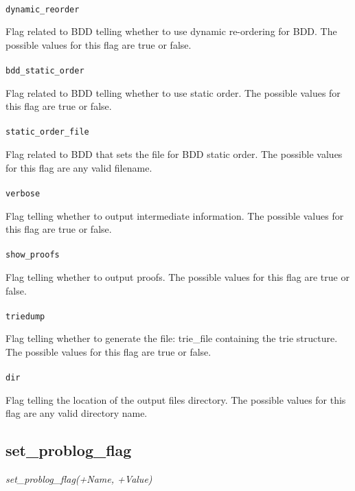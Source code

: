 \documentclass[a4paper,12pt]{article}
\begin{document}
\paragraph{}
\texttt{dynamic\_reorder}

Flag related to BDD telling whether to use dynamic re-ordering for BDD.
The possible values for this flag are true or false.
\paragraph{}
\texttt{bdd\_static\_order}

Flag related to BDD telling whether to use static order.
The possible values for this flag are true or false.
\paragraph{}
\texttt{static\_order\_file}

Flag related to BDD that sets the file for BDD static order.
The possible values for this flag are any valid filename.
\paragraph{}
\texttt{verbose}

Flag telling whether to output intermediate information.
The possible values for this flag are true or false.
\paragraph{}
\texttt{show\_proofs}

Flag telling whether to output proofs.
The possible values for this flag are true or false.
\paragraph{}
\texttt{triedump}

Flag telling whether to generate the file: trie\_file containing the trie structure.
The possible values for this flag are true or false.
\paragraph{}
\texttt{dir}

Flag telling the location of the output files directory.
The possible values for this flag are any valid directory name.

\subsection{set\_problog\_flag}
\textit{set\_problog\_flag(+Name, +Value)}
\end{document}
